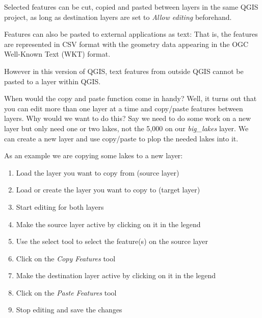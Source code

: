 

Selected features can be cut, copied and pasted between layers in the
same QGIS project, as long as destination layers are set to 
\textit{Allow editing} beforehand.

Features can also be pasted to external applications as text:  That is,
the features are represented in CSV format with the geometry data appearing 
in the OGC Well-Known Text (WKT) format.

However in this version of QGIS, text features from outside QGIS cannot 
be pasted to a layer within QGIS.

When would the copy and paste function come in handy? Well, it turns out that 
you can edit more than one layer at a time and copy/paste features between 
layers. Why would we want to do this?  Say we need to do some work on a new 
layer but only need one or two lakes, not the 5,000 on our \textsl{big\_lakes} 
layer. We can create a new layer and use copy/paste to plop the needed lakes 
into it. 

As an example we are copying some lakes to a new layer:

\begin{enumerate}
\item Load the layer you want to copy from (source layer)
\item Load or create the layer you want to copy to (target layer) 
\item Start editing for both layers 
\item Make the source layer active by clicking on it in the legend 
\item Use the select tool to select the feature(s) on the source layer
\item Click on the \textsl{Copy Features} tool
\item Make the destination layer active by clicking on it in the legend 
\item Click on the \textsl{Paste Features} tool 
\item Stop editing and save the changes
\end{enumerate}

